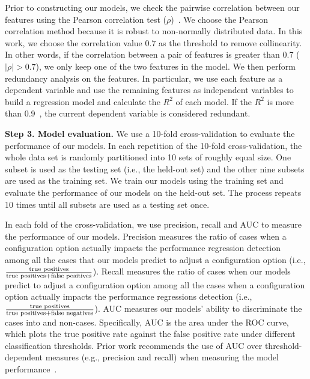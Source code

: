 Prior to constructing our models, we check the pairwise correlation between our features using the Pearson correlation test (\(\rho\))~\cite{benesty2009pearson}. We choose the Pearson correlation method because it is robust to non-normally distributed data. In this work, we choose the correlation value $0.7$ as the threshold to remove collinearity. In other words, if the correlation between a pair of features is greater than 0.7 (\(|\rho|>0.7\)), we only keep one of the two features in the model.
We then perform redundancy analysis on the features. In particular, we use each feature as a dependent variable and use the remaining features as independent variables to build a regression model and calculate the $R^2$ of each model. If the $R^2$ is more than 0.9~\cite{markASE}, the current dependent variable is considered redundant. 

\noindent\textbf{Step 3. Model evaluation.}
We use a 10-fold cross-validation to evaluate the performance of our models. 
In each repetition of the 10-fold cross-validation, the whole data set is randomly partitioned into 10 sets of roughly equal size. One subset is used as the testing set (i.e., the held-out set) and the other nine subsets are used as the training set. 
We train our models using the training set and evaluate the performance of our models on the held-out set.
The process repeats 10 times until all subsets are used as a testing set once.

In each fold of the cross-validation, we use precision, recall and 
AUC to measure the performance of our models.
Precision measures the ratio of cases when a configuration option actually impacts the performance regression detection among all the cases that our models predict to adjust a configuration option (i.e., $\frac{\textnormal{true positives}}{\textnormal{true positives} + \textnormal{false positives}}$). Recall measures the ratio of cases when our models predict to adjust a configuration option among all the cases when a configuration option actually impacts the performance regressions detection (i.e., $\frac{\textnormal{true positives}}{\textnormal{true positives} + \textnormal{false negatives}}$). 
AUC measures our models' ability to discriminate the \instance cases into \inconsistent and non-\inconsistent cases. Specifically, AUC is the area under the ROC curve, which plots the true positive rate against the false positive rate under different classification thresholds. 
Prior work recommends the use of AUC over threshold-dependent measures (e.g., precision and recall) when measuring the model performance~\cite{tantithamthavorn18experience}.


